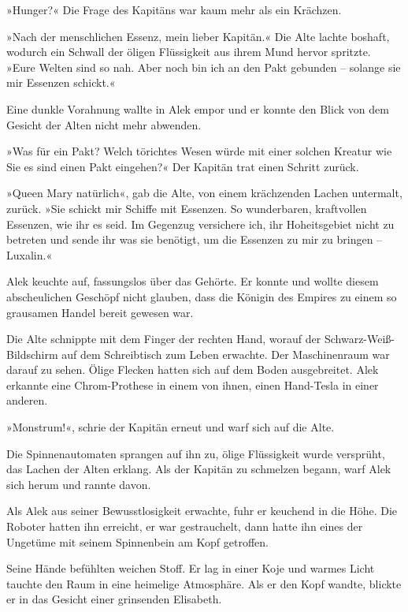 »Hunger?« Die Frage des Kapitäns war kaum mehr als ein Krächzen.

»Nach der menschlichen Essenz, mein lieber Kapitän.« Die Alte
lachte boshaft, wodurch ein Schwall der öligen Flüssigkeit aus
ihrem Mund hervor spritzte. »Eure Welten sind so nah. Aber noch bin
ich an den Pakt gebunden – solange sie mir Essenzen schickt.«

\bigpar

Eine dunkle Vorahnung wallte in Alek empor und er konnte den Blick
von dem Gesicht der Alten nicht mehr abwenden.

»Was für ein Pakt? Welch törichtes Wesen würde mit einer solchen
Kreatur wie Sie es sind einen Pakt eingehen?« Der Kapitän trat
einen Schritt zurück.

»Queen Mary natürlich«, gab die Alte, von einem krächzenden Lachen
untermalt, zurück. »Sie schickt mir Schiffe mit Essenzen. So
wunderbaren, kraftvollen Essenzen, wie ihr es seid. Im Gegenzug
versichere ich, ihr Hoheitsgebiet nicht zu betreten und sende ihr
was sie benötigt, um die Essenzen zu mir zu bringen – Luxalin.«

Alek keuchte auf, fassungslos über das Gehörte. Er konnte und
wollte diesem abscheulichen Geschöpf nicht glauben, dass die
Königin des Empires zu einem so grausamen Handel bereit gewesen
war.

\bigpar

Die Alte schnippte mit dem Finger der rechten Hand, worauf der
Schwarz-Weiß-Bildschirm auf dem Schreibtisch zum Leben erwachte.
Der Maschinenraum war darauf zu sehen. Ölige Flecken hatten sich
auf dem Boden ausgebreitet. Alek erkannte eine Chrom-Prothese in
einem von ihnen, einen Hand-Tesla in einer anderen.

\bigpar

»Monstrum!«, schrie der Kapitän erneut und warf sich auf die Alte.

\bigpar

Die Spinnenautomaten sprangen auf ihn zu, ölige Flüssigkeit wurde
versprüht, das Lachen der Alten erklang. Als der Kapitän zu
schmelzen begann, warf Alek sich herum und rannte davon.

\tb

Als Alek aus seiner Bewusstlosigkeit erwachte, fuhr er keuchend in
die Höhe. Die Roboter hatten ihn erreicht, er war gestrauchelt,
dann hatte ihn eines der Ungetüme mit seinem Spinnenbein am Kopf
getroffen.

Seine Hände befühlten weichen Stoff. Er lag in einer Koje und
warmes Licht tauchte den Raum in eine heimelige Atmosphäre. Als er
den Kopf wandte, blickte er in das Gesicht einer grinsenden
Elisabeth.

